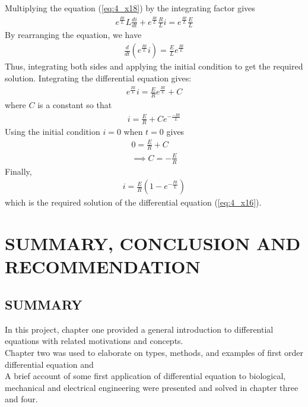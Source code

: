 \documentclass[11pt]{report}
\newcommand{\sps}{\\[0.2cm]}
\newcommand{\refn}[1]{(\ref{#1})}
\newcommand{\refx}[1]{\refn{eq:#1}}
\newcommand{\NI}{\noindent}
\begin{document}
	Multiplying the equation \refx{4_x18} by the integrating factor gives
	\begin{eqnarray}
		e^{\frac{Rt}{L}}L\frac{di}{dt} + e^{\frac{Rt}{L}}\frac{R}{L}i = e^{\frac{Rt}{L}}\frac{E}{L}\label{eq:4_x19}
	\end{eqnarray}
	By rearranging the equation, we have
	\begin{eqnarray}
		\frac{d}{dt}\left(e^{\frac{Rt}{L}} i\right) = \frac{E}{L}e^{\frac{Rt}{L}}
	\end{eqnarray}
	Thus, integrating both sides and applying the initial condition to get the required solution. Integrating the differential equation gives:
	\begin{eqnarray}
		e^{\frac{Rt}{L}} i = \frac{E}{R}e^{\frac{Rt}{L}} + C
	\end{eqnarray}
	where $C$ is a constant so that
	\begin{eqnarray}
		i = \frac{E}{R}+Ce^{-\frac{-Rt}{L}}
	\end{eqnarray}
	Using the initial condition $i=0$ when $t=0$ gives
	\begin{eqnarray}
		0 = \frac{E}{R} + C\sps
		\implies C = -\frac{E}{R}
	\end{eqnarray}
	Finally, 
	\begin{eqnarray*}
		i = \frac{E}{R}\left(1-e^{-\frac{Rt}{L}}\right)
	\end{eqnarray*}
	which is the required solution of the differential equation \refx{4_x16}.


	\chapter{SUMMARY, CONCLUSION AND RECOMMENDATION}
	\section{SUMMARY}
	In this project, chapter one provided a general introduction to differential equations with related motivations and concepts.\\
	
	\NI Chapter two was used to elaborate on types, methods, and examples of first order differential equation and\\
	
	\NI A brief account of some first application of differential equation to biological, mechanical and electrical engineering were presented and solved in chapter three and four.
	
	
\end{document}
